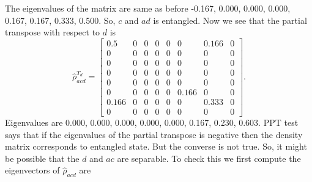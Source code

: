 \documentclass{scrartcl}
\begin{document}
The eigenvalues of the matrix are same as before -0.167, 0.000, 0.000, 0.000, 0.167, 0.167, 0.333, 0.500. So, $c$ and $ad$ is entangled. Now we see that the partial transpose with respect to $d$ is 
\begin{equation*}
	\hat{\rho}_{acd}^{T_d} = \left[\begin{matrix}0.5 & 0 & 0 & 0 & 0 & 0 & 0.166 & 0\\0 & 0 & 0 & 0 & 0 & 0 & 0 & 0\\0 & 0 & 0 & 0 & 0 & 0 & 0 & 0\\0 & 0 & 0 & 0 & 0 & 0 & 0 & 0\\0 & 0 & 0 & 0 & 0 & 0 & 0 & 0\\0 & 0 & 0 & 0 & 0 & 0.166 & 0 & 0\\0.166 & 0 & 0 & 0 & 0 & 0 & 0.333 & 0\\0 & 0 & 0 & 0 & 0 & 0 & 0 & 0\end{matrix}\right].
\end{equation*}
Eigenvalues are	0.000, 0.000, 0.000, 0.000, 0.000, 0.167, 0.230, 0.603. PPT test says that if the eigenvalues of the partial transpose is negative then the density matrix corresponds to entangled state. But the converse is not true. So, it might be possible that the $d$ and $ac$ are separable. To check this we first compute the eigenvectors of $\hat{\rho}_{acd}$ are 
\end{document}
